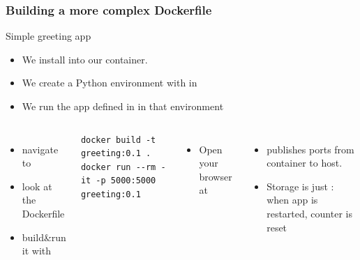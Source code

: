 \begin{frame}[fragile]
	\frametitle{Building a more complex Dockerfile}
	\begin{block}{Simple greeting app}
		\begin{itemize}
			\item We install  into our container.
			\item We create a Python environment with  in 
			\item We run the  app defined in  in that environment
		\end{itemize}
	\end{block}

	\vspace{-.5cm}\begin{columns}[t]
		\begin{itemize}
			\item navigate to 
			\item look at the Dockerfile
			\item build\&run it with
		\end{itemize}
		\begin{lstlisting}
docker build -t greeting:0.1 .
docker run --rm -it -p 5000:5000 greeting:0.1
		\end{lstlisting}
		\begin{itemize}
			\item Open your browser at 
		\end{itemize}
		
		
		\begin{itemize}
			\item {} publishes ports from container to host.
			\item Storage is just : when app is restarted, counter is reset
		\end{itemize}
	\end{columns}	
\end{frame}

